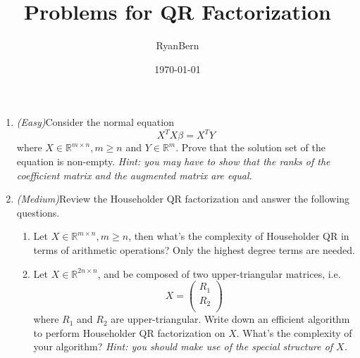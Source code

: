 \documentclass[a4paper]{article}
\title{Problems for QR Factorization}
\author{RyanBern}
\date{\today}
\begin{document}
\maketitle
\begin{enumerate}
\item \emph{(Easy)}Consider the normal equation
\[
X^TX\beta = X^TY
\]
where $X\in\mathbb{R}^{m\times n},m \geqslant n$ and $Y\in\mathbb{R}^{m}$.
Prove that the solution set of the equation is non-empty. \emph{Hint: you may
have to show that the ranks of the coefficient matrix and the augmented matrix
are equal.}

\item \emph{(Medium)}Review the Householder QR factorization and answer the following questions.
\begin{enumerate}
\item Let $X\in\mathbb{R}^{m\times n}, m \geqslant n$, then what's the complexity
of Householder QR in terms of arithmetic operations? Only the highest degree
terms are needed.
\item Let $X\in\mathbb{R}^{2n\times n}$, and be composed of two upper-triangular
matrices, i.e.
\[
X=\left(\begin{array}{c}
R_1 \\
R_2 \\
\end{array}
\right)
\]
where $R_1$ and $R_2$ are upper-triangular. Write down an efficient algorithm to
perform Householder QR factorization on $X$. What's the complexity of your
algorithm? \emph{Hint: you should make use of the special structure of $X$.}
\end{enumerate}


\end{enumerate}
\end{document}
